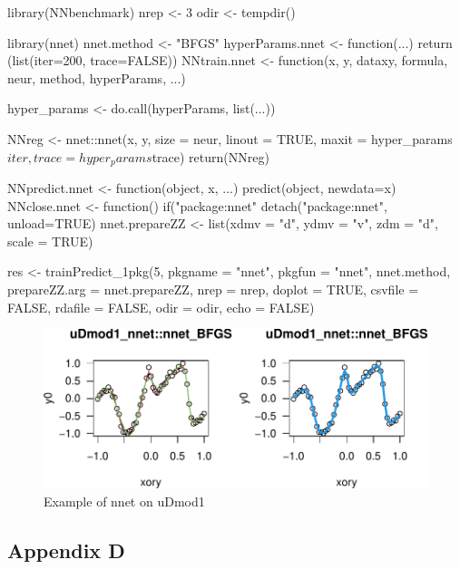 \begin{Schunk}
\begin{Sinput}
library(NNbenchmark)
nrep <- 3       
odir <- tempdir()

library(nnet)
nnet.method <- "BFGS"
hyperParams.nnet <- function(...) {
    return (list(iter=200, trace=FALSE))
}
NNtrain.nnet <- function(x, y, dataxy, formula, neur, method, hyperParams, ...) {
    
    hyper_params <- do.call(hyperParams, list(...))
    
    NNreg <- nnet::nnet(x, y, size = neur, linout = TRUE, 
                        maxit = hyper_params$iter, trace=hyper_params$trace)
    return(NNreg)
}
NNpredict.nnet  <- function(object, x, ...) { predict(object, newdata=x) }
NNclose.nnet    <- function() {  if("package:nnet" %
                                detach("package:nnet", unload=TRUE) }
nnet.prepareZZ  <- list(xdmv = "d", ydmv = "v", zdm = "d", scale = TRUE)
\end{Sinput}
\end{Schunk}

\begin{Schunk}
\begin{Sinput}
res <- trainPredict_1pkg(5, pkgname = "nnet", pkgfun = "nnet", nnet.method,
  prepareZZ.arg = nnet.prepareZZ, nrep = nrep, doplot = TRUE,
  csvfile = FALSE, rdafile = FALSE, odir = odir, echo = FALSE)
\end{Sinput}
\begin{figure}

{\centering \includegraphics{gsoc1920-MVKDN-rev1_files/figure-latex/unnamed-chunk-8-1} 

}

\caption[Example of nnet on uDmod1]{Example of nnet on uDmod1}\label{fig:unnamed-chunk-8}
\end{figure}
\end{Schunk}

\hypertarget{appendix-d}{%
\subsection{Appendix D}\label{appendix-d}}

